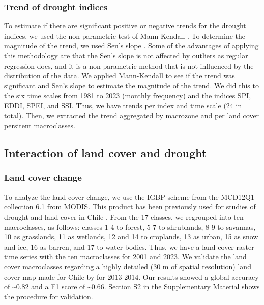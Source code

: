 \documentclass[
  authoryear,
  preprint,
  3p,
  onecolumn]{elsarticle}
\begin{document}
\hypertarget{trend-of-drought-indices}{%
\subsubsection{Trend of drought
indices}\label{trend-of-drought-indices}}

To estimate if there are significant positive or negative trends for the
drought indices, we used the non-parametric test of Mann-Kendall
\citep{Kendall1975}. To determine the magnitude of the trend, we used
Sen's slope \citep{Sen1968}. Some of the advantages of applying this
methodology are that the Sen's slope is not affected by outliers as
regular regression does, and it is a non-parametric method that is not
influenced by the distribution of the data. We applied Mann-Kendall to
see if the trend was significant and Sen's slope to estimate the
magnitude of the trend. We did this to the six time scales from 1981 to
2023 (monthly frequency) and the indices SPI, EDDI, SPEI, and SSI. Thus,
we have trends per index and time scale (24 in total). Then, we
extracted the trend aggregated by macrozone and per land cover persitent
macroclasses.

\hypertarget{interaction-of-land-cover-and-drought}{%
\subsection{Interaction of land cover and
drought}\label{interaction-of-land-cover-and-drought}}

\hypertarget{land-cover-change}{%
\subsubsection{Land cover change}\label{land-cover-change}}

To analyze the land cover change, we use the IGBP scheme from the
MCD12Q1 collection 6.1 from MODIS. This product has been previously used
for studies of drought and land cover in Chile
\citep{Fuentes2021, Zambrano2018}. From the 17 classes, we regrouped
into ten macroclasses, as follows: classes 1-4 to forest, 5-7 to
shrublands, 8-9 to savannas, 10 as grasslands, 11 as wetlands, 12 and 14
to croplands, 13 as urban, 15 as snow and ice, 16 as barren, and 17 to
water bodies. Thus, we have a land cover raster time series with the ten
macroclasses for 2001 and 2023. We validate the land cover macroclasses
regarding a highly detailed (30 m of spatial resolution) land cover map
made for Chile by \citet{Zhao2016} for 2013-2014. Our results showed a
global accuracy of \textasciitilde0.82 and a F1 score of
\textasciitilde0.66. Section S2 in the Supplementary Material shows the
procedure for validation.
\end{document}
